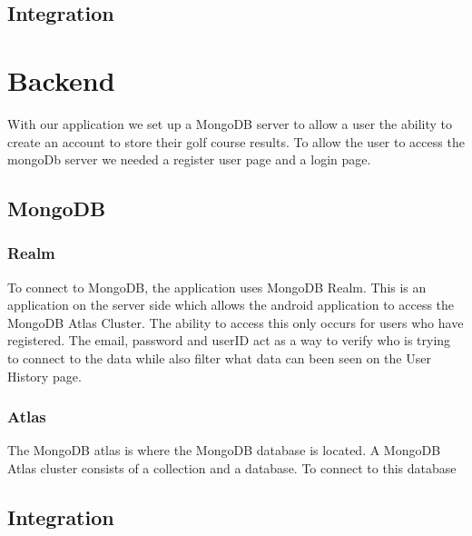 \subsection{Integration}

\section{Backend}
With our application we set up a MongoDB server to allow a user the ability to create an account to store their golf course results. To allow the user to access the mongoDb server we needed a register user page and a login page.
\subsection{MongoDB}
\subsubsection{Realm}
To connect to MongoDB, the application uses MongoDB Realm. This is an application on the server side which allows the android application to access the MongoDB Atlas Cluster. The ability to access this only occurs for users who have registered. The email, password and userID act as a way to verify who is trying to connect to the data while also filter what data can been seen on the User History page.
\subsubsection{Atlas}
The MongoDB atlas is where the MongoDB database is located. A MongoDB Atlas cluster consists of a collection and a database. To connect to this database
\subsection{Integration}

